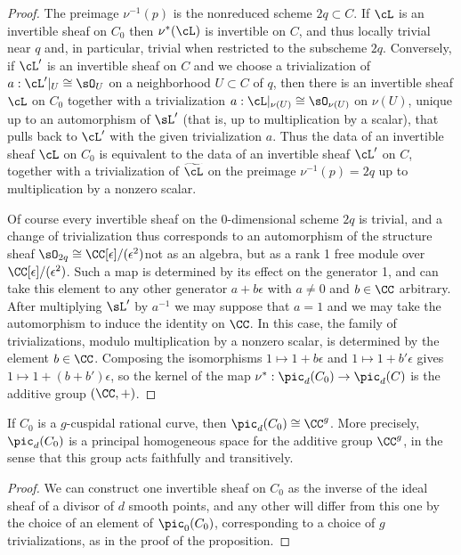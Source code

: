 \begin{proof}
The preimage $\nu^{-1}(p)$ is the nonreduced scheme $2q \subset C$. If
$\cL$ is an invertible sheaf on
$C_{0}$ then $\nu^{*}(\cL)$ is invertible on $C$, and thus locally
trivial near $q$ and, in particular, trivial
when restricted to the subscheme $2q$. Conversely,
if $\cL'$ is an invertible sheaf on $C$ and we choose a trivialization
of $a: \cL'|_{U}\cong \sO_{U}$ on a neighborhood $ U\subset C$
of $q$, then there is an invertible sheaf $\cL$ on $C_{0}$ together with
a  trivialization
$a: \cL|_{\nu(U)}\cong \sO_{\nu(U)}$
on $\nu(U)$, unique up to an automorphism of $\sL'$ (that is, up to
multiplication by a scalar), that
pulls back to $\cL'$ with the given trivialization $a$.
Thus the data of an invertible sheaf $\cL$ on $C_0$ is equivalent
to the data of an invertible sheaf $\cL'$ on $C$, together with a
trivialization of $\widetilde \cL$ on the preimage $\nu^{-1}(p) = 2q$
up to multiplication by a nonzero scalar.

Of course every invertible sheaf on the
0-dimensional
scheme $2q$
is trivial, and a change of trivialization
thus corresponds to an automorphism of the structure sheaf $\sO_{2q}
\cong \CC[\epsilon]/(\epsilon^{2})$\emdash not as an algebra, but as a
rank 1 free module over $\CC[\epsilon]/(\epsilon^{2})$. Such a map is
determined by
its effect on the generator 1, and can take this element to any other
generator $a+b\epsilon$ with
$a\neq 0$ and $b\in \CC$ arbitrary. After multiplying $\sL'$ by $a^{-1}$
we may suppose that $a =1$ and we may take the automorphism to induce
the identity on $\CC$.
In this case, the family of trivializations, modulo multiplication by
a nonzero scalar, is
determined by the element $b\in \CC$.
Composing the isomorphisms
$1\mapsto 1+b\epsilon$ and $1\mapsto 1+b'\epsilon$  gives $1\mapsto
1+(b+b')\epsilon$,
so the kernel of the map $\nu^{*}: \pic_{d}(C_{0}) \to \pic_{d}(C)$ is
the additive group $(\CC, +)$.
\end{proof}

\begin{corollary}
If $C_{0}$ is a $g$-cuspidal rational curve, then $\pic_{d}(C_{0})
\cong \CC^{g}$. More precisely,
%
$\pic_{d}(C_{0})$ is a principal homogeneous space for the additive
group $\CC^{g}$, in the sense that
this group acts faithfully and transitively.
\unif
\end{corollary}

\begin{proof}
We can construct one invertible sheaf on $C_{0}$ as the inverse of the
ideal sheaf of a divisor of $d$ smooth points, and any other will differ
from this one by the choice of an element of $\pic_{0}(C_{0})$,
corresponding to a choice of $g$ trivializations, as in the proof of
the proposition.
\unif
\end{proof}


